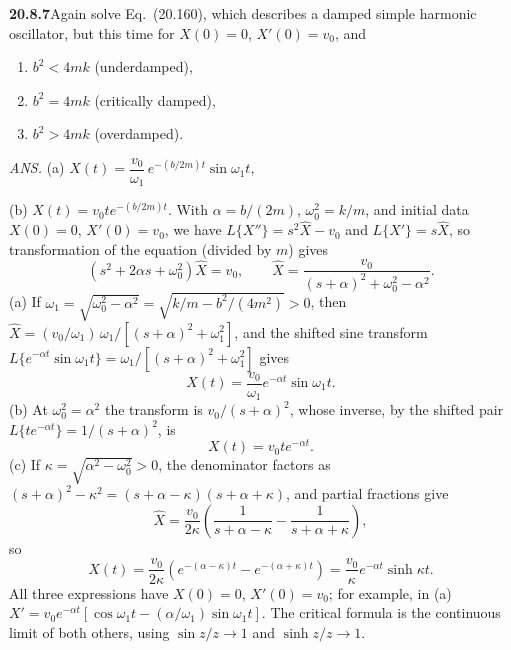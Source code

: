 \par\bigskip
\noindent\textbf{20.8.7}\quad Again solve Eq.~(20.160), which
describes a damped simple harmonic oscillator, but this time for
$X(0)=0$, $X'(0)=v_{0}$, and
\begin{enumerate}
\item[(a)] $b^{2}<4mk$ (underdamped),
\item[(b)] $b^{2}=4mk$ (critically damped),
\item[(c)] $b^{2}>4mk$ (overdamped).
\end{enumerate}
\par\nobreak\hfill\emph{ANS.}\enspace
(a) $X(t)=\dfrac{v_{0}}{\omega_{1}}\,e^{-(b/2m)t}\sin\omega_{1}t$,
\par\nobreak\hfill
(b) $X(t)=v_{0}te^{-(b/2m)t}$.
\solution
With $\alpha=b/(2m)$, $\omega_0^2=k/m$, and initial data
$X(0)=0$, $X'(0)=v_0$, we have $L\{X''\}=s^2\widehat X-v_0$
and $L\{X'\}=s\widehat X$, so transformation of the equation
(divided by $m$) gives
\[
(s^2+2\alpha s+\omega_0^2)\widehat X=v_0,
\qquad
\widehat X=\frac{v_0}{(s+\alpha)^2+\omega_0^2-\alpha^2}.
\]
(a) If $\omega_1=\sqrt{\omega_0^2-\alpha^2}
=\sqrt{k/m-b^2/(4m^2)}>0$, then
$\widehat X=(v_0/\omega_1)\,\omega_1/[(s+\alpha)^2+\omega_1^2]$,
and the shifted sine transform
$L\{e^{-\alpha t}\sin\omega_1t\}=\omega_1/[(s+\alpha)^2+\omega_1^2]$
gives
\[
\boxed{X(t)=\frac{v_0}{\omega_1}e^{-\alpha t}\sin\omega_1t}.
\]
(b) At $\omega_0^2=\alpha^2$ the transform is
$v_0/(s+\alpha)^2$, whose inverse, by the shifted pair
$L\{te^{-\alpha t}\}=1/(s+\alpha)^2$, is
\[
\boxed{X(t)=v_0t e^{-\alpha t}}.
\]
(c) If $\kappa=\sqrt{\alpha^2-\omega_0^2}>0$, the
denominator factors as
$(s+\alpha)^2-\kappa^2=(s+\alpha-\kappa)(s+\alpha+\kappa)$, and
partial fractions give
\[
\widehat X=\frac{v_0}{2\kappa}
\left(\frac1{s+\alpha-\kappa}-\frac1{s+\alpha+\kappa}\right),
\]
so
\[
X(t)=\frac{v_0}{2\kappa}\left(e^{-(\alpha-\kappa)t}
-e^{-(\alpha+\kappa)t}\right)
=\boxed{\frac{v_0}{\kappa}e^{-\alpha t}\sinh\kappa t}.
\]
All three expressions have $X(0)=0$, $X'(0)=v_0$; for example,
in (a) $X'=v_0e^{-\alpha t}[\cos\omega_1t-(\alpha/\omega_1)
\sin\omega_1t]$.
The critical formula is the continuous limit of both others,
using $\sin z/z\to1$ and $\sinh z/z\to1$.


